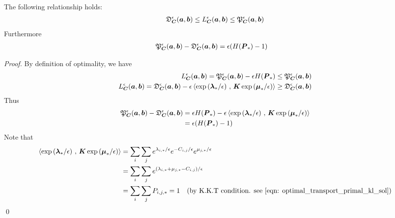 \documentclass[11pt]{article}
\begin{document}
\begin{proposition}
The following relationship holds:
\begin{align}
\mathfrak{D}_{\boldsymbol{C}}^{\epsilon}(\boldsymbol{a}, \boldsymbol{b}) \le L_{\boldsymbol{C}}^{\epsilon}(\boldsymbol{a}, \boldsymbol{b})   \le \mathfrak{P}_{\boldsymbol{C}}^{\epsilon}(\boldsymbol{a}, \boldsymbol{b})  \label{eqn: sinkhorn_primal_dual_divg_inequality}
\end{align}
Furthermore
\begin{align}
 \mathfrak{P}_{\boldsymbol{C}}^{\epsilon}(\boldsymbol{a}, \boldsymbol{b})  - \mathfrak{D}_{\boldsymbol{C}}^{\epsilon}(\boldsymbol{a}, \boldsymbol{b}) & = \epsilon (H(\boldsymbol{P}_{*})- 1) \label{eqn: sinkhorn_primal_dual_divg_gap}
\end{align}
\end{proposition}
\begin{proof}
By definition of optimality, we have
\begin{align*}
L_{\boldsymbol{C}}^{\epsilon}(\boldsymbol{a}, \boldsymbol{b}) =  \mathfrak{P}_{\boldsymbol{C}}^{\epsilon}(\boldsymbol{a}, \boldsymbol{b}) -  \epsilon H(\boldsymbol{P}_{*})  \le    \mathfrak{P}_{\boldsymbol{C}}^{\epsilon}(\boldsymbol{a}, \boldsymbol{b})\\
L_{\boldsymbol{C}}^{\epsilon}(\boldsymbol{a}, \boldsymbol{b}) =   \mathfrak{D}_{\boldsymbol{C}}^{\epsilon}(\boldsymbol{a}, \boldsymbol{b})  - \epsilon \left\langle \exp\left(\boldsymbol{\lambda}_{*}/\epsilon\right)\,,\, \boldsymbol{K}\exp\left(\boldsymbol{\mu}_{*}/\epsilon\right) \right\rangle \ge  \mathfrak{D}_{\boldsymbol{C}}^{\epsilon}(\boldsymbol{a}, \boldsymbol{b})
\end{align*}
Thus 
\begin{align*}
 \mathfrak{P}_{\boldsymbol{C}}^{\epsilon}(\boldsymbol{a}, \boldsymbol{b})  - \mathfrak{D}_{\boldsymbol{C}}^{\epsilon}(\boldsymbol{a}, \boldsymbol{b}) & =\epsilon H(\boldsymbol{P}_{*}) -  \epsilon \left\langle \exp\left(\boldsymbol{\lambda}_{*}/\epsilon\right)\,,\, \boldsymbol{K}\exp\left(\boldsymbol{\mu}_{*}/\epsilon\right) \right\rangle\\
 &=  \epsilon (H(\boldsymbol{P}_{*}) - 1) 
\end{align*}
 Note that 
\begin{align*}
\left\langle \exp\left(\boldsymbol{\lambda}_{*}/\epsilon\right)\,,\, \boldsymbol{K}\exp\left(\boldsymbol{\mu}_{*}/\epsilon\right) \right\rangle &= \sum_{i}\sum_{j}e^{\lambda_{i,*}/\epsilon}e^{-C_{i,j}/\epsilon}  e^{\mu_{j,*}/\epsilon} \\
&= \sum_{i}\sum_{j}e^{(\lambda_{i,*} +\mu_{j,*} - C_{i,j} )/\epsilon} \\
&= \sum_{i}\sum_{j}P_{i,j, *} = 1 \quad (\text{by K.K.T condition. see \eqref{eqn: optimal_transport_primal_kl_sol}})
\end{align*} \qed
\end{proof} 
\end{document}
